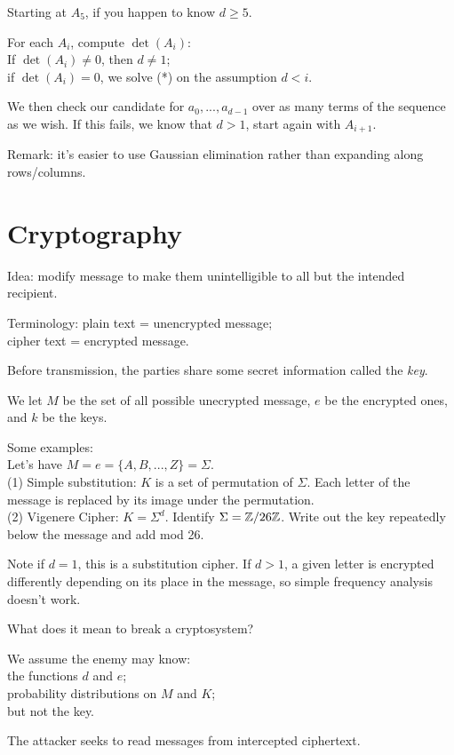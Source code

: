 \documentclass[a4paper]{article}
\begin{document}
Starting at $A_5$, if you happen to know $d \geq 5$.

For each $A_i$, compute $\det (A_i)$:\\
If $\det(A_i) \neq 0$, then $d \neq 1$;\\
if $\det(A_i) = 0$, we solve (*) on the assumption $d < i$.

We then check our candidate for $a_0,...,a_{d-1}$ over as many terms of the sequence as we wish. If this fails, we know that $d>1$, start again with $A_{i+1}$.

Remark: it's easier to use Gaussian elimination rather than expanding along rows/columns.

\newpage
\section{Cryptography}
Idea: modify message to make them unintelligible to all but the intended recipient.

Terminology: plain text = unencrypted message;\\
cipher text = encrypted message.

Before transmission, the parties share some secret information called the \emph{key}.

We let $M$ be the set of all possible unecrypted message, $e$ be the encrypted ones, and $k$ be the keys.

Some examples:\\
Let's have $M=e=\{A,B,...,Z\} = \Sigma$.\\
(1) Simple substitution: $K$ is a set of permutation of $\Sigma$. Each letter of the message is replaced by its image under the permutation.\\
(2) Vigenere Cipher: $K = \Sigma^d$. Identify $\Sigma=\mathbb{Z}/26\mathbb{Z}$. Write out the key repeatedly below the message and add mod 26.

Note if $d=1$, this is a substitution cipher. If $d>1$, a given letter is encrypted differently depending on its place in the message, so simple frequency analysis doesn't work.

What does it mean to break a cryptosystem?

We assume the enemy may know:\\
the functions $d$ and $e$;\\
probability distributions on $M$ and $K$;\\
but not the key.

The attacker seeks to read messages from intercepted ciphertext.
\end{document}

